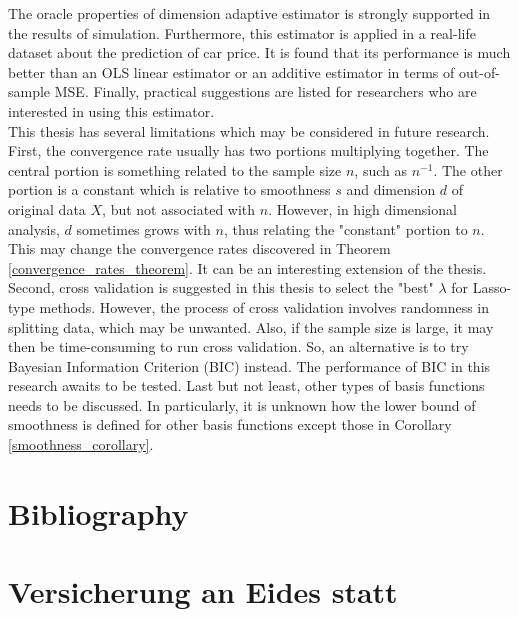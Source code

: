 \documentclass[12pt, a4paper]{article}
\theoremstyle{MAstyle} \newtheorem{assumption}{Assumption}[section]
\theoremstyle{MAstyle} \newtheorem{definition}{Definition}[section]
\theoremstyle{MAstyle} \newtheorem{theorem}{Theorem}[section]
\theoremstyle{MAstyle} \newtheorem{corollary}{Corollary}[section]
\begin{document}
            The oracle properties of dimension adaptive estimator is strongly supported in the results of simulation. Furthermore, this estimator is applied in a real-life dataset about the prediction of car price. It is found that its performance is much better than an OLS linear estimator or an additive estimator in terms of out-of-sample MSE. Finally, practical suggestions are listed for researchers who are interested in using this estimator.\\

            This thesis has several limitations which may be considered in future research. First, the convergence rate usually has two portions multiplying together. The central portion is something related to the sample size $n$, such as $n^{-1}$. The other portion is a constant which is relative to smoothness $s$ and dimension $d$ of original data $X$, but not associated with $n$. However, in high dimensional analysis, $d$ sometimes grows with $n$, thus relating the "constant" portion to $n$. This may change the convergence rates discovered in Theorem \ref{convergence_rates_theorem}. It can be an interesting extension of the thesis. Second, cross validation is suggested in this thesis to select the "best" $\lambda$ for Lasso-type methods. However, the process of cross validation involves randomness in splitting data, which may be unwanted. Also, if the sample size is large, it may then be time-consuming to run cross validation. So, an alternative is to try Bayesian Information Criterion (BIC) instead. The performance of BIC in this research awaits to be tested. Last but not least, other types of basis functions needs to be discussed. In particularly, it is unknown how the lower bound of smoothness is defined for other basis functions except those in Corollary \ref{smoothness_corollary}.


        
        \newpage
	\section{Bibliography}
	    \printbibliography[heading=none]
        
        \newpage
        

        
		
		
	\clearpage
 
	\thispagestyle{empty}
	\section*{Versicherung an Eides statt}	
	
\end{document}
